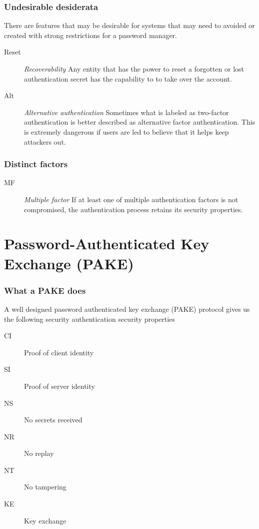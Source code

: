 \documentclass[xcolor={dvipsnames,table,hyperref}]{beamer}
\newcommand{\propdescription}[1]{\textit{#1}\hspace*{\fill}\linebreak }
\begin{document}
\begin{frame}
  \frametitle{Undesirable desiderata}
  There are features that may be desirable for systems
  that may need to avoided or created with strong restrictions
  for a password manager.
  \begin{description}
    \item[Reset] \propdescription{Recoverability}
      Any entity that has the power to reset a forgotten or lost authentication secret has the capability to to take over the account.
    \item[Alt] \propdescription{Alternative authentication}
      Sometimes what is labeled as two-factor authentication is better described as alternative factor authentication.
      This is extremely dangerous if users are led to believe that it
      helps keep attackers out.
  \end{description}
\end{frame}

\begin{frame}
  \frametitle{Distinct factors}
  \begin{description}
    \item[MF] \propdescription{Multiple factor}
      If at least one of multiple authentication factors is not compromised, the authentication process retains its security properties.
  \end{description}
\end{frame}

\section{Password-Authenticated Key Exchange (PAKE)}\label{sec:pake}
\begin{frame}
  \frametitle{What a PAKE does}
  \label{frame:pake}
  A well designed password authenticated key exchange (PAKE) protocol gives us
  the following security authentication security properties
  \begin{description}
    \item[CI] Proof of client identity
    \item[SI] Proof of server identity
    \item[NS] No secrets received
    \item[NR] No replay
    \item[NT] No tampering
    \item[KE] Key exchange
  \end{description}
\end{frame}
\end{document}
